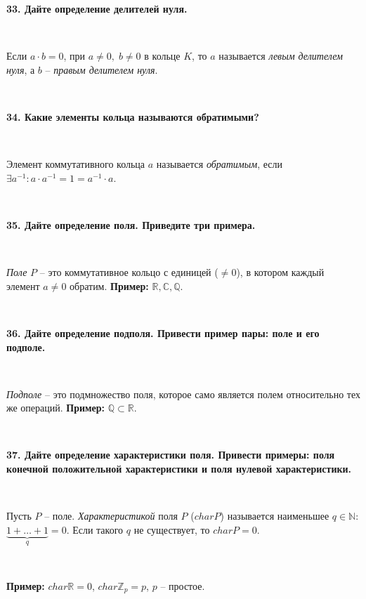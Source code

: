 \documentclass{article}
\begin{document}
    \newpage

    \textbf{33. Дайте определение делителей нуля.}

    {
        $\;$
        \setlength{\parindent}{0.4cm}
        \hangindent=0.4cm

    Если $a\cdot b=0$, при $a\ne 0, \; b\ne 0$ в кольце $K$, то $a$ называется \textit{левым делителем нуля}, а $b$ -- \textit{правым делителем нуля}.

        $\;$
        \setlength{\parindent}{0cm}
        \hangindent=0cm
    }



    \textbf{34. Какие элементы кольца называются обратимыми?}

    {
        $\;$
        \setlength{\parindent}{0.4cm}
        \hangindent=0.4cm

    Элемент коммутативного кольца $a$ называется \textit{обратимым}, если $\exists a^{-1}:a\cdot a^{-1}=1=a^{-1}\cdot a$.

        $\;$
        \setlength{\parindent}{0cm}
        \hangindent=0cm
    }

    \textbf{35. Дайте определение поля. Приведите три примера.}

    {
        $\;$
        \setlength{\parindent}{0.4cm}
        \hangindent=0.4cm

    \textit{Поле} $P$ -- это коммутативное кольцо с единицей ($\ne 0$), в котором каждый элемент $a\ne 0$ обратим. \textbf{Пример:} $\mathbb{R}, \mathbb{C}, \mathbb{Q}$.

        $\;$
        \setlength{\parindent}{0cm}
        \hangindent=0cm
    }

    \textbf{36. Дайте определение подполя. Привести пример пары: поле и его подполе.}

    {
        $\;$
        \setlength{\parindent}{0.4cm}
        \hangindent=0.4cm

    \textit{Подполе} -- это подмножество поля, которое само является полем относительно тех же операций. \textbf{Пример:} $\mathbb{Q}\subset\mathbb{R}$.

        $\;$
        \setlength{\parindent}{0cm}
        \hangindent=0cm
    }

    \textbf{37. Дайте определение характеристики поля. Привести примеры: поля конечной положительной характеристики и поля нулевой характеристики.}

    {
        $\;$
        \setlength{\parindent}{0.4cm}
        \hangindent=0.4cm

    Пусть $P$ -- поле. \textit{Характеристикой} поля $P$ ($char P$) называется наименьшее $q\in\mathbb{N}:$ $\underbrace{1+\ldots+1}_{q}=0$. Если такого $q$ не существует, то $char P=0$.

        $\;$

        \textbf{Пример:} $char\mathbb{R}=0$, $char\mathbb{Z}_p=p$, $p$ -- простое.

        $\;$
        \setlength{\parindent}{0cm}
        \hangindent=0cm
    }
\end{document}
